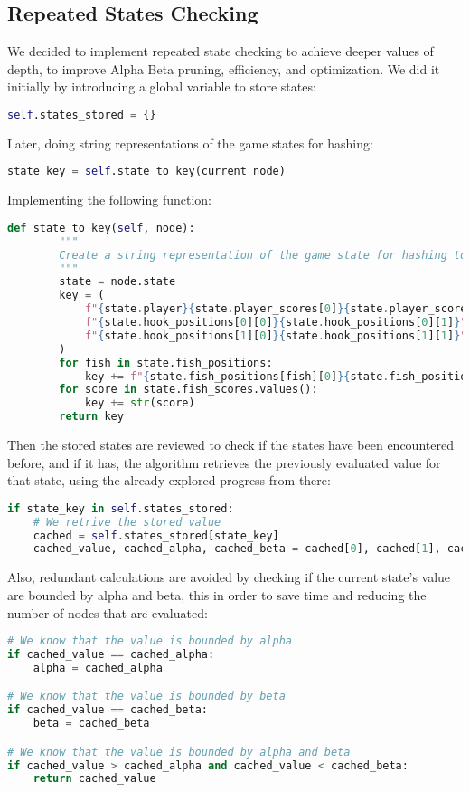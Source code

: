 \documentclass[12pt]{article}
\begin{document}
\subsection{Repeated States Checking}
We decided to implement repeated state checking to achieve deeper values of depth, to improve Alpha Beta pruning, efficiency, and optimization. We did it initially by introducing a global variable to store states:
\begin{lstlisting}[language=Python, caption=Repeated states checking implementation]
self.states_stored = {}
\end{lstlisting}
 Later, doing string representations of the game states for hashing: 
\begin{lstlisting}[language=Python, caption=Repeated states checking implementation]
state_key = self.state_to_key(current_node)
\end{lstlisting}
Implementing the following function:
\begin{lstlisting}[language=Python, caption=Repeated states checking implementation]
def state_to_key(self, node):
        """
        Create a string representation of the game state for hashing to use it as key.
        """
        state = node.state
        key = (
            f"{state.player}{state.player_scores[0]}{state.player_scores[1]}"
            f"{state.hook_positions[0][0]}{state.hook_positions[0][1]}"
            f"{state.hook_positions[1][0]}{state.hook_positions[1][1]}"
        )
        for fish in state.fish_positions:
            key += f"{state.fish_positions[fish][0]}{state.fish_positions[fish][1]}"
        for score in state.fish_scores.values():
            key += str(score)
        return key
\end{lstlisting}
Then the stored states are reviewed to check if the states have been encountered before, and if it has, the algorithm retrieves the previously evaluated value for that state, using the already explored progress from there:
\begin{lstlisting}[language=Python, caption=Repeated states checking implementation]
if state_key in self.states_stored:
    # We retrive the stored value
    cached = self.states_stored[state_key]
    cached_value, cached_alpha, cached_beta = cached[0], cached[1], cached[2]
\end{lstlisting}
Also, redundant calculations are avoided by checking if the current state's value are bounded by alpha and beta, this in order to save time and reducing the number of nodes that are evaluated:
\begin{lstlisting}[language=Python, caption=Repeated states checking implementation]
# We know that the value is bounded by alpha
if cached_value == cached_alpha:
    alpha = cached_alpha

# We know that the value is bounded by beta
if cached_value == cached_beta:
    beta = cached_beta

# We know that the value is bounded by alpha and beta
if cached_value > cached_alpha and cached_value < cached_beta:
    return cached_value
\end{lstlisting}
\end{document}
